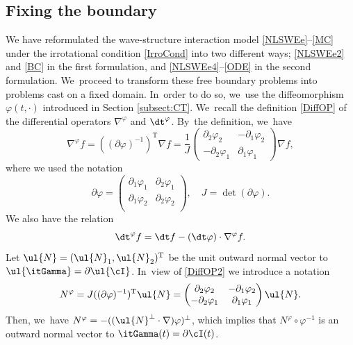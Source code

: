 \subsection{Fixing the boundary}\label{sectfixing}
We have reformulated the wave-structure interaction model \eqref{NLSWEe}--\eqref{MC} under the irrotational condition \eqref{IrroCond} into two different ways;
\eqref{NLSWEe2} and \eqref{BC} in the first formulation, and \eqref{NLSWEe4}--\eqref{ODE} in the second formulation. We~proceed to transform these free boundary problems into problems cast on a fixed domain. In~order to do so, we~use the diffeomorphism $\varphi(t,\cdot)$ introduced in Section \ref{subsect:CT}. We~recall the definition \eqref{DiffOP} of the differential operators $\nabla^\varphi$ and $\dt^\varphi$. By~the definition, we~have
\begin{equation}\label{DiffOP2}
\nabla^\varphi f
= ((\partial\varphi)^{-1})^\mathrm{T}\nabla f
= \frac{1}{J}
\begin{pmatrix}
\partial_2\varphi_2 & -\partial_1\varphi_2 \\
-\partial_2\varphi_1 & \partial_1\varphi_1
\end{pmatrix}
\nabla f,
\end{equation}
where we used the notation
\[
\partial\varphi
= \begin{pmatrix}
\partial_1\varphi_1 & \partial_2\varphi_1 \\
\partial_1\varphi_2 & \partial_2\varphi_2 \\
\end{pmatrix}, \quad
J = \det(\partial\varphi).
\]
We also have the relation
\begin{equation}\label{DiffOP3}
\dt^\varphi f = \dt f - (\dt \varphi)\cdot\nabla^\varphi f.
\end{equation}
Let $\ul{N} = (\ul{N}_1,\ul{N}_2)^\mathrm{T}$ be the unit outward normal vector to $\ul{\itGamma}=\partial\ul{\cI}$. In~view of \eqref{DiffOP2} we introduce a notation
\begin{equation}\label{Nphi}
N^\varphi = J((\partial\varphi)^{-1})^\mathrm{T}\ul{N} =
\begin{pmatrix}
\partial_2\varphi_2 & -\partial_1\varphi_2 \\
-\partial_2\varphi_1 & \partial_1\varphi_1
\end{pmatrix}
\ul{N}.
\end{equation}
Then, we~have $N^\varphi = -((\ul{N}^{\perp}\cdot\nabla)\varphi)^\perp$,
which implies that $N^\varphi\circ\varphi^{-1}$ is an outward normal vector to $\itGamma(t)= \partial\cI(t)$.
